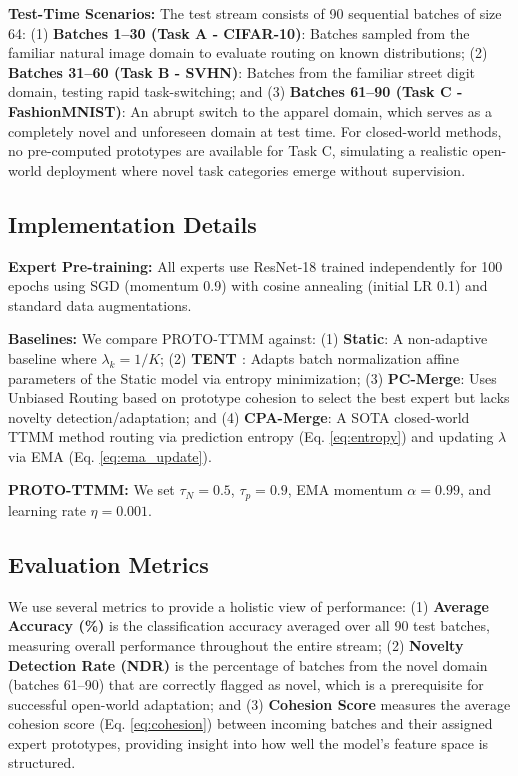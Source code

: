 \documentclass[twoside]{article}
\begin{document}
\textbf{Test-Time Scenarios:} The test stream consists of 90 sequential batches of size 64:
(1) \textbf{Batches 1--30 (Task A - CIFAR-10)}: Batches sampled from the familiar natural image domain to evaluate routing on known distributions;
(2) \textbf{Batches 31--60 (Task B - SVHN)}: Batches from the familiar street digit domain, testing rapid task-switching; and
(3) \textbf{Batches 61--90 (Task C - FashionMNIST)}: An abrupt switch to the apparel domain, which serves as a completely novel and unforeseen domain at test time. For closed-world methods, no pre-computed prototypes are available for Task C, simulating a realistic open-world deployment where novel task categories emerge without supervision.

\subsection{Implementation Details}

\textbf{Expert Pre-training:} All experts use ResNet-18 \cite{he2016deep} trained independently for 100 epochs using SGD (momentum 0.9) with cosine annealing (initial LR 0.1) and standard data augmentations.

\textbf{Baselines:} We compare PROTO-TTMM against:
(1) \textbf{Static}: A non-adaptive baseline where $\lambda_k = 1/K$;
(2) \textbf{TENT \cite{wang2020tent}}: Adapts batch normalization affine parameters of the Static model via entropy minimization;
(3) \textbf{PC-Merge}: Uses Unbiased Routing based on prototype cohesion to select the best expert but lacks novelty detection/adaptation; and
(4) \textbf{CPA-Merge}: A SOTA closed-world TTMM method routing via prediction entropy (Eq. \ref{eq:entropy}) and updating $\lambda$ via EMA (Eq. \ref{eq:ema_update}).

\textbf{PROTO-TTMM:} We set $\tau_N=0.5$, $\tau_p=0.9$, EMA momentum $\alpha=0.99$, and learning rate $\eta=0.001$.

\subsection{Evaluation Metrics}
We use several metrics to provide a holistic view of performance: (1) \textbf{Average Accuracy (\%)} is the classification accuracy averaged over all 90 test batches, measuring overall performance throughout the entire stream; (2) \textbf{Novelty Detection Rate (NDR)} is the percentage of batches from the novel domain (batches 61--90) that are correctly flagged as novel, which is a prerequisite for successful open-world adaptation; and (3) \textbf{Cohesion Score} measures the average cohesion score (Eq. \ref{eq:cohesion}) between incoming batches and their assigned expert prototypes, providing insight into how well the model's feature space is structured.
\end{document}
